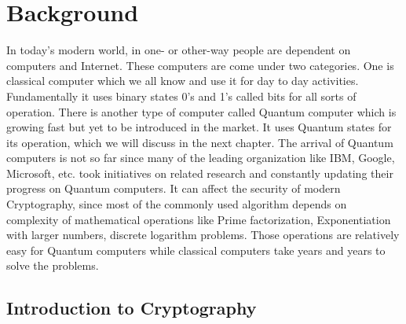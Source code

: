 \documentclass{cpp}
\begin{document}
\tableofcontents
\newpage

 \setcounter{page}{1} \thispagestyle{empty}

\chapter{Background}

In today’s modern world, in one- or other-way people are dependent on computers and Internet. These computers are come under two categories. One is classical computer which we all know and use it for day to day activities. Fundamentally it uses binary states 0’s and 1’s called bits for all sorts of operation. There is another type of computer called Quantum computer which is growing fast but yet to be introduced in the market. It uses Quantum states for its operation, which we will discuss in the next chapter.  The arrival of Quantum computers is not so far since many of the leading organization like IBM, Google, Microsoft, etc. took initiatives on related research and constantly updating their progress on Quantum computers. It can affect the security of modern Cryptography, since most of the commonly used algorithm depends on complexity of mathematical operations like Prime factorization, Exponentiation with larger numbers, discrete logarithm problems. Those operations are relatively easy for Quantum computers while classical computers take years and years to solve the problems. 



\section{Introduction to Cryptography}
\end{document}
